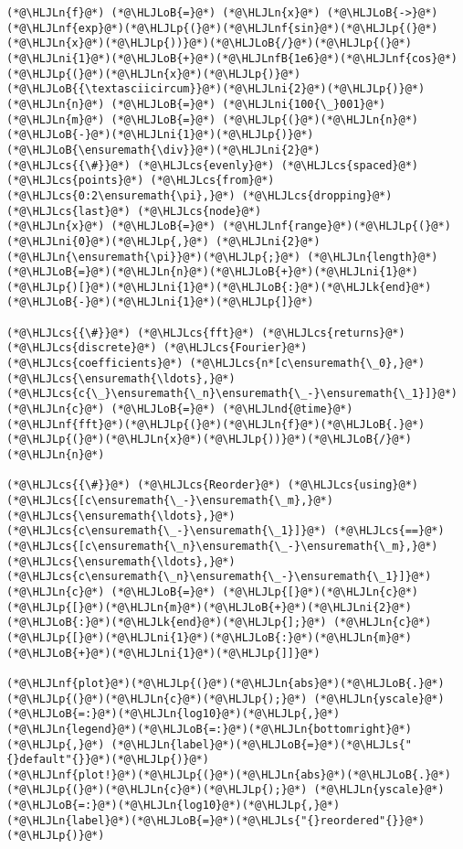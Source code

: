 \documentclass[12pt,a4paper]{article}
\newcommand{\HLJLk}[1]{\textcolor[RGB]{148,91,176}{\textbf{#1}}}
\newcommand{\HLJLn}[1]{#1}
\newcommand{\HLJLnd}[1]{\textcolor[RGB]{214,102,97}{#1}}
\newcommand{\HLJLnf}[1]{\textcolor[RGB]{66,102,213}{#1}}
\newcommand{\HLJLs}[1]{\textcolor[RGB]{201,61,57}{#1}}
\newcommand{\HLJLnfB}[1]{\textcolor[RGB]{59,151,46}{#1}}
\newcommand{\HLJLni}[1]{\textcolor[RGB]{59,151,46}{#1}}
\newcommand{\HLJLoB}[1]{\textcolor[RGB]{102,102,102}{\textbf{#1}}}
\newcommand{\HLJLp}[1]{#1}
\newcommand{\HLJLcs}[1]{\textcolor[RGB]{153,153,119}{\textit{#1}}}
\begin{document}
\begin{lstlisting}
(*@\HLJLn{f}@*) (*@\HLJLoB{=}@*) (*@\HLJLn{x}@*) (*@\HLJLoB{->}@*) (*@\HLJLnf{exp}@*)(*@\HLJLp{(}@*)(*@\HLJLnf{sin}@*)(*@\HLJLp{(}@*)(*@\HLJLn{x}@*)(*@\HLJLp{))}@*)(*@\HLJLoB{/}@*)(*@\HLJLp{(}@*)(*@\HLJLni{1}@*)(*@\HLJLoB{+}@*)(*@\HLJLnfB{1e6}@*)(*@\HLJLnf{cos}@*)(*@\HLJLp{(}@*)(*@\HLJLn{x}@*)(*@\HLJLp{)}@*)(*@\HLJLoB{{\textasciicircum}}@*)(*@\HLJLni{2}@*)(*@\HLJLp{)}@*)
(*@\HLJLn{n}@*) (*@\HLJLoB{=}@*) (*@\HLJLni{100{\_}001}@*)
(*@\HLJLn{m}@*) (*@\HLJLoB{=}@*) (*@\HLJLp{(}@*)(*@\HLJLn{n}@*)(*@\HLJLoB{-}@*)(*@\HLJLni{1}@*)(*@\HLJLp{)}@*)(*@\HLJLoB{\ensuremath{\div}}@*)(*@\HLJLni{2}@*)
(*@\HLJLcs{{\#}}@*) (*@\HLJLcs{evenly}@*) (*@\HLJLcs{spaced}@*) (*@\HLJLcs{points}@*) (*@\HLJLcs{from}@*) (*@\HLJLcs{0:2\ensuremath{\pi},}@*) (*@\HLJLcs{dropping}@*) (*@\HLJLcs{last}@*) (*@\HLJLcs{node}@*)
(*@\HLJLn{x}@*) (*@\HLJLoB{=}@*) (*@\HLJLnf{range}@*)(*@\HLJLp{(}@*)(*@\HLJLni{0}@*)(*@\HLJLp{,}@*) (*@\HLJLni{2}@*)(*@\HLJLn{\ensuremath{\pi}}@*)(*@\HLJLp{;}@*) (*@\HLJLn{length}@*)(*@\HLJLoB{=}@*)(*@\HLJLn{n}@*)(*@\HLJLoB{+}@*)(*@\HLJLni{1}@*)(*@\HLJLp{)[}@*)(*@\HLJLni{1}@*)(*@\HLJLoB{:}@*)(*@\HLJLk{end}@*)(*@\HLJLoB{-}@*)(*@\HLJLni{1}@*)(*@\HLJLp{]}@*)

(*@\HLJLcs{{\#}}@*) (*@\HLJLcs{fft}@*) (*@\HLJLcs{returns}@*) (*@\HLJLcs{discrete}@*) (*@\HLJLcs{Fourier}@*) (*@\HLJLcs{coefficients}@*) (*@\HLJLcs{n*[c\ensuremath{\_0},}@*) (*@\HLJLcs{\ensuremath{\ldots},}@*) (*@\HLJLcs{c{\_}\ensuremath{\_n}\ensuremath{\_-}\ensuremath{\_1}]}@*)
(*@\HLJLn{c}@*) (*@\HLJLoB{=}@*) (*@\HLJLnd{@time}@*) (*@\HLJLnf{fft}@*)(*@\HLJLp{(}@*)(*@\HLJLn{f}@*)(*@\HLJLoB{.}@*)(*@\HLJLp{(}@*)(*@\HLJLn{x}@*)(*@\HLJLp{))}@*)(*@\HLJLoB{/}@*)(*@\HLJLn{n}@*)

(*@\HLJLcs{{\#}}@*) (*@\HLJLcs{Reorder}@*) (*@\HLJLcs{using}@*) (*@\HLJLcs{[c\ensuremath{\_-}\ensuremath{\_m},}@*) (*@\HLJLcs{\ensuremath{\ldots},}@*) (*@\HLJLcs{c\ensuremath{\_-}\ensuremath{\_1}]}@*) (*@\HLJLcs{==}@*) (*@\HLJLcs{[c\ensuremath{\_n}\ensuremath{\_-}\ensuremath{\_m},}@*) (*@\HLJLcs{\ensuremath{\ldots},}@*) (*@\HLJLcs{c\ensuremath{\_n}\ensuremath{\_-}\ensuremath{\_1}]}@*)
(*@\HLJLn{c}@*) (*@\HLJLoB{=}@*) (*@\HLJLp{[}@*)(*@\HLJLn{c}@*)(*@\HLJLp{[}@*)(*@\HLJLn{m}@*)(*@\HLJLoB{+}@*)(*@\HLJLni{2}@*)(*@\HLJLoB{:}@*)(*@\HLJLk{end}@*)(*@\HLJLp{];}@*) (*@\HLJLn{c}@*)(*@\HLJLp{[}@*)(*@\HLJLni{1}@*)(*@\HLJLoB{:}@*)(*@\HLJLn{m}@*)(*@\HLJLoB{+}@*)(*@\HLJLni{1}@*)(*@\HLJLp{]]}@*)

(*@\HLJLnf{plot}@*)(*@\HLJLp{(}@*)(*@\HLJLn{abs}@*)(*@\HLJLoB{.}@*)(*@\HLJLp{(}@*)(*@\HLJLn{c}@*)(*@\HLJLp{);}@*) (*@\HLJLn{yscale}@*)(*@\HLJLoB{=:}@*)(*@\HLJLn{log10}@*)(*@\HLJLp{,}@*) (*@\HLJLn{legend}@*)(*@\HLJLoB{=:}@*)(*@\HLJLn{bottomright}@*)(*@\HLJLp{,}@*) (*@\HLJLn{label}@*)(*@\HLJLoB{=}@*)(*@\HLJLs{"{}default"{}}@*)(*@\HLJLp{)}@*)
(*@\HLJLnf{plot!}@*)(*@\HLJLp{(}@*)(*@\HLJLn{abs}@*)(*@\HLJLoB{.}@*)(*@\HLJLp{(}@*)(*@\HLJLn{c}@*)(*@\HLJLp{);}@*) (*@\HLJLn{yscale}@*)(*@\HLJLoB{=:}@*)(*@\HLJLn{log10}@*)(*@\HLJLp{,}@*) (*@\HLJLn{label}@*)(*@\HLJLoB{=}@*)(*@\HLJLs{"{}reordered"{}}@*)(*@\HLJLp{)}@*)
\end{lstlisting}
\end{document}

